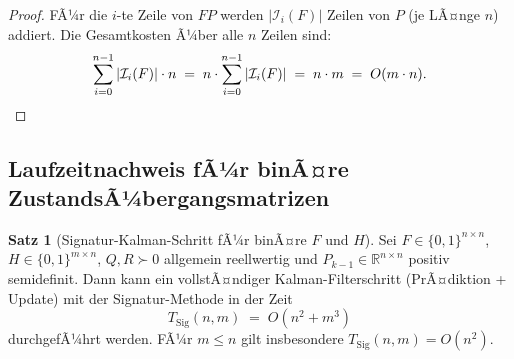 ﻿\documentclass[a4paper,12pt]{article}
\theoremstyle{definition}
\newtheorem{satz}{Satz}
\begin{document}
\begin{proof}
FÃ¼r die $i$-te Zeile von $FP$ werden $|\mathcal{I}_i(F)|$ Zeilen von $P$
(je LÃ¤nge $n$) addiert. Die Gesamtkosten Ã¼ber alle $n$ Zeilen sind:
\[
    \sum_{i=0}^{n-1} |\mathcal{I}_i(F)| \cdot n \;=\; n \cdot \sum_{i=0}^{n-1}|\mathcal{I}_i(F)|
    \;=\; n \cdot m \;=\; O(m \cdot n). \qedhere
\]
\end{proof}

\subsection{Laufzeitnachweis fÃ¼r binÃ¤re ZustandsÃ¼bergangsmatrizen}

\begin{satz}[Signatur-Kalman-Schritt fÃ¼r binÃ¤re $F$ und $H$]
\label{satz:bin_kalman}
    Sei $F \in \{0,1\}^{n \times n}$, $H \in \{0,1\}^{m \times n}$,
    $Q, R \succ 0$ allgemein reellwertig und $P_{k-1} \in \mathbb{R}^{n \times n}$
    positiv semidefinit. Dann kann ein vollstÃ¤ndiger Kalman-Filterschritt
    (PrÃ¤diktion + Update) mit der Signatur-Methode in der Zeit
    \[
        T_{\mathrm{Sig}}(n, m) \;=\; O(n^2 + m^3)
    \]
    durchgefÃ¼hrt werden. FÃ¼r $m \leq n$ gilt insbesondere $T_{\mathrm{Sig}}(n,m) = O(n^2)$.
\end{satz}
\end{document}
